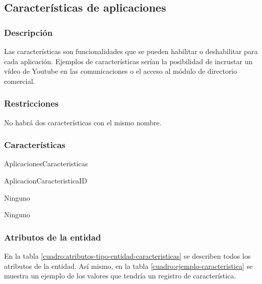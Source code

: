 \subsection{Características de aplicaciones}

\subsubsection*{Descripción}
Las características son funcionalidades que se pueden habilitar o deshabilitar para cada aplicación. Ejemplos de características serían la posibilidad de incrustar un vídeo de Youtube en las comunicaciones o el acceso al módulo de directorio comercial.

\subsubsection*{Restricciones}
No habrá dos características con el mismo nombre.

\subsubsection*{Características}
\begin{description}[nosep,style=multiline,labelindent=0.8cm,leftmargin=4.5cm,font=\normalfont]
    \item[Nombre] AplicacionesCaracteristicas
    \item[Id. principal] AplicacionCaracteristicaID
    \item[Id. alternativo] Ninguno
    \item[Atrib. heredados] Ninguno
\end{description}

\subsubsection*{Atributos de la entidad}
En la tabla \ref{cuadro:atributos-tipo-entidad-caracteristicas} se describen todos los atributos de la entidad. Así mismo, en la tabla \ref{cuadro:ejemplo-caracteristica} se muestra un ejemplo de los valores que tendría un registro de característica.


